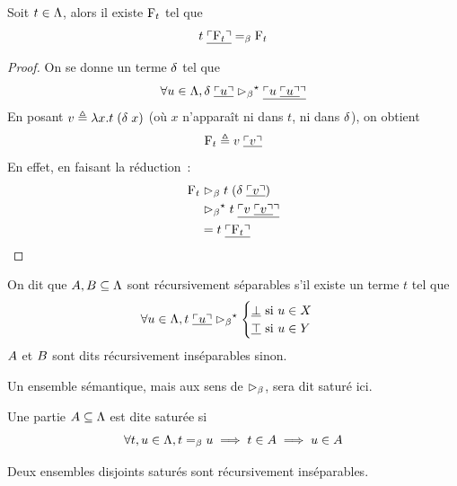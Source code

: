 \begin{theorem}
  Soit $t\in\Lambda$, alors il existe $\mathrm{F}_{t}$ tel que
  \[t\;\underline{\ulcorner\mathrm{F}_{t}\urcorner} =_{\beta} \mathrm{F}_{t}\]
\end{theorem}

\begin{proof}
  On se donne un terme $\delta$ tel que
  \[\forall u\in \Lambda, \delta\;\underline{\ulcorner u\urcorner} \mathrel{\rhd_{\beta}}^{\mathord{\star}}
  \underline{\ulcorner u\;\underline{\ulcorner u\urcorner}\urcorner}\]
  En posant $v \triangleq \lambda x.t\;(\delta\;x)$ (où $x$ n'apparaît ni dans $t$,
  ni dans $\delta$), on obtient
  \[\mathrm{F}_{t} \triangleq v\;\underline{\ulcorner v\urcorner}\]
  En effet, en faisant la réduction~:
  \begin{align*}
    \mathrm{F}_{t} &\mathrel{\rhd_{\beta}} t\;(\delta\;\underline{\ulcorner v\urcorner})\\
    &\mathrel{\rhd_{\beta}}^{\mathord{\star}} t\;\underline{\ulcorner v\;\underline{\ulcorner v\urcorner}\urcorner}\\
    &= t\;\underline{\ulcorner\mathrm{F}_{t}\urcorner}\qedhere
  \end{align*}
\end{proof}

\begin{definition}
  On dit que $A,B\subseteq \Lambda$ sont récursivement séparables
  s'il existe un terme $t$ tel que
  \[\forall u \in \Lambda, t\;\underline{\ulcorner u\urcorner} \mathrel{\rhd_{\beta}}^{\mathord{\star}}
  \begin{cases}
    \underline{\bot}\text{ si } u \in X\\
    \underline{\top}\text{ si } u \in Y
  \end{cases}\]
  $A$ et $B$ sont dits récursivement inséparables sinon.
\end{definition}

\noindent
Un ensemble sémantique, mais aux sens de $\mathrel{\rhd_{\beta}}$, sera dit saturé ici.

\begin{definition}
  Une partie $A\subseteq \Lambda$ est dite saturée si
  \[\forall t,u \in \Lambda,
  t =_{\beta} u \implies t \in A \implies u \in A\]
\end{definition}

\begin{theorem}
  Deux ensembles disjoints saturés sont récursivement inséparables.
\end{theorem}

